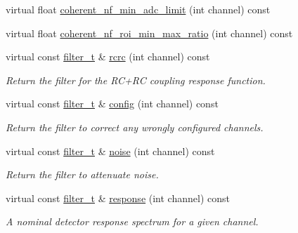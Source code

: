 \begin{DoxyCompactItemize}
\item 
virtual float \hyperlink{class_wire_cell_1_1_sig_proc_1_1_omni_channel_noise_d_b_a346695c1e101b6cbcfac60ae4c9f0ea3}{coherent\+\_\+nf\+\_\+min\+\_\+adc\+\_\+limit} (int channel) const
\item 
virtual float \hyperlink{class_wire_cell_1_1_sig_proc_1_1_omni_channel_noise_d_b_ae92b71da5d91c1069ba78d9658d97f8b}{coherent\+\_\+nf\+\_\+roi\+\_\+min\+\_\+max\+\_\+ratio} (int channel) const
\item 
virtual const \hyperlink{class_wire_cell_1_1_i_channel_noise_database_a0acbae29743542eb1c652f7a56e692f5}{filter\+\_\+t} \& \hyperlink{class_wire_cell_1_1_sig_proc_1_1_omni_channel_noise_d_b_a0155aba843a5a04966ffcfe556b207f8}{rcrc} (int channel) const
\begin{DoxyCompactList}\small\item\em Return the filter for the R\+C+\+RC coupling response function. \end{DoxyCompactList}\item 
virtual const \hyperlink{class_wire_cell_1_1_i_channel_noise_database_a0acbae29743542eb1c652f7a56e692f5}{filter\+\_\+t} \& \hyperlink{class_wire_cell_1_1_sig_proc_1_1_omni_channel_noise_d_b_acc904d0a6472acede55bd40ef8b6cd01}{config} (int channel) const
\begin{DoxyCompactList}\small\item\em Return the filter to correct any wrongly configured channels. \end{DoxyCompactList}\item 
virtual const \hyperlink{class_wire_cell_1_1_i_channel_noise_database_a0acbae29743542eb1c652f7a56e692f5}{filter\+\_\+t} \& \hyperlink{class_wire_cell_1_1_sig_proc_1_1_omni_channel_noise_d_b_a125b09b4d7d5cb973ae418936343bf4a}{noise} (int channel) const
\begin{DoxyCompactList}\small\item\em Return the filter to attenuate noise. \end{DoxyCompactList}\item 
virtual const \hyperlink{class_wire_cell_1_1_i_channel_noise_database_a0acbae29743542eb1c652f7a56e692f5}{filter\+\_\+t} \& \hyperlink{class_wire_cell_1_1_sig_proc_1_1_omni_channel_noise_d_b_ae269e377629b9a96c8e0cdb0f30353a4}{response} (int channel) const
\begin{DoxyCompactList}\small\item\em A nominal detector response spectrum for a given channel. \end{DoxyCompactList}\item 

\end{DoxyCompactItemize}
